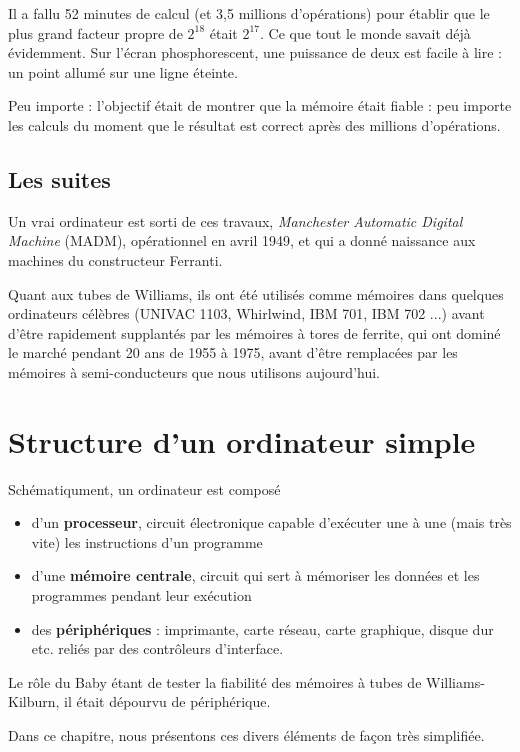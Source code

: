 \begin{multicols}{2}
Il a fallu 52 minutes de calcul (et 3,5 millions d'opérations) pour
établir que le plus grand facteur propre de $2^{18}$ était
$2^{17}$. Ce que tout le monde savait déjà évidemment. Sur
  l'écran phosphorescent, une puissance de deux est facile à lire : un
  point allumé sur une ligne éteinte. 

Peu importe : l'objectif était de montrer que
la mémoire était fiable : peu importe les calculs du moment que le
résultat est correct après des millions d'opérations.

\subsection{Les suites}

Un vrai ordinateur est sorti de ces travaux, \emph{Manchester
Automatic Digital Machine} (MADM), opérationnel en avril 1949, et qui a
donné naissance aux machines du constructeur Ferranti.

Quant aux tubes de Williams, ils ont été utilisés comme mémoires dans
quelques ordinateurs célèbres (UNIVAC 1103, Whirlwind, IBM 701, IBM
702 ...) avant d'être rapidement supplantés par les mémoires à tores
de ferrite, qui ont dominé le marché pendant 20 ans de 1955 à 1975,
avant d'être remplacées par les mémoires à semi-conducteurs que nous
utilisons aujourd'hui.

\section{Structure d'un ordinateur simple}

Schématiqument, un ordinateur est composé
\begin{itemize}
\item d'un \textbf{processeur}, circuit électronique capable d'exécuter une à
  une (mais très vite) les instructions d'un programme
\item d'une \textbf{mémoire centrale}, circuit qui sert à mémoriser les données
  et les programmes pendant leur exécution
\item des \textbf{périphériques} : imprimante, carte réseau, carte graphique, disque dur
  etc. reliés par des contrôleurs d'interface.
\end{itemize}

Le rôle du Baby étant de tester la fiabilité des mémoires à tubes de
Williams-Kilburn, il était dépourvu de périphérique. 

Dans ce chapitre, nous présentons ces divers éléments de façon très
simplifiée.



\end{multicols}
